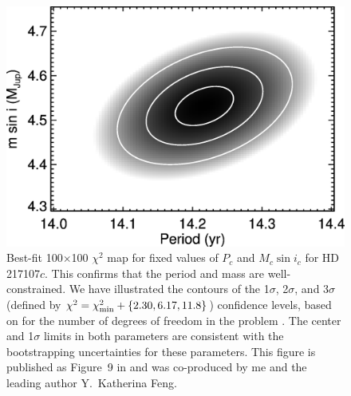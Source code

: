 \newpage

\begin{figure}
\includegraphics[scale=0.6]{boottran/feng2015-f9-217107.eps} 
\caption{Best-fit 100$\times$100 $\chi^2$ map for fixed values of $P_c$ and
  $M_c\sin{i_c}$ for HD 217107$c$. This confirms that the period and
  mass are well-constrained.  We have illustrated the contours of the
  1$\sigma$, 2$\sigma$, and 3$\sigma$ (defined by $\chi^2 =
  \chi^2_{\rm min} + \{2.30, 6.17, 11.8\}$) confidence levels, based on
  for the number of degrees of freedom in the problem
  \citep{2002nrca.book.....P}. The center and 1$\sigma$ limits in both
  parameters are consistent with the bootstrapping uncertainties for
  these parameters. This figure is published as Figure~9 in
  \cite{2015ApJ...800...22F} and was co-produced by me and the
  leading author Y.\ Katherina Feng.
\label{boottran:mmperplot}}
\end{figure}


